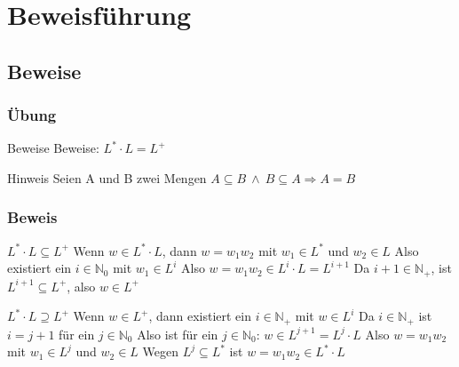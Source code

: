 \documentclass{beamer}
\begin{document}
\section{Beweisführung}
\subsection{Beweise}

\begin{frame}
\frametitle{Übung}
\begin{block}{Beweise}
Beweise: $L^{*} \cdot L = L^{+}$
\end{block}
\begin{block}{Hinweis}
Seien A und B zwei Mengen
\newline $A \subseteq B \ \land \ B \subseteq A \Rightarrow A = B$
\end{block}
\end{frame}

\begin{frame}
\frametitle{Beweis}
\begin{block}{$L^{*} \cdot L \subseteq L^{+}$}
Wenn $w \in L^{*} \cdot L$, dann $w = w_{1}w_{2}$ mit $w_{1} \in L^{*}$ und
$w_{2} \in L$ \newline
Also existiert ein $i \in \mathbb N_{0}$ mit $w_{1} \in L^{i}$ \newline
Also $w = w_{1}w_{2} \in L^{i} \cdot L = L^{i+1}$ \newline
Da $i+1 \in \mathbb N_{+}$, ist $L^{i+1} \subseteq L^{+}$, also $w \in L^{+}$
\end{block}

\begin{block}{$L^{*} \cdot L \supseteq L^{+}$}
Wenn $w \in L^{+}$, dann existiert ein $i \in \mathbb N_{+}$ mit $w \in L^{i}$
\newline Da $i \in \mathbb N_{+}$ ist $i = j + 1$ für ein $j \in \mathbb N_{0}$
\newline Also ist für ein $j \in \mathbb N_{0}$: $w \in L^{j+1} = L^{j} \cdot L$
\newline Also $w = w_{1}w_{2}$ mit $w_{1} \in L^{j}$ und $w_{2} \in L$ \newline
Wegen $L^{j} \subseteq L^{*}$ ist $w = w_{1}w_{2} \in L^{*} \cdot L$
\end{block}
\end{frame}
\end{document}
